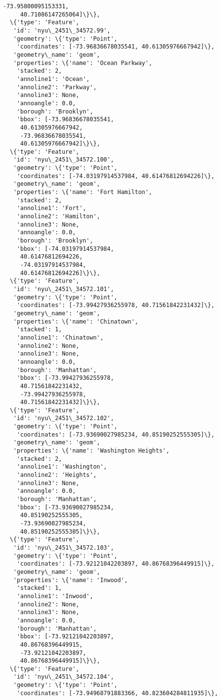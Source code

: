 \documentclass[11pt]{article}
\begin{document}
\begin{tcolorbox}[breakable, size=fbox, boxrule=.5pt, pad at break*=1mm, opacityfill=0]
\begin{Verbatim}[commandchars=\\\{\}]
     -73.95800095153331,
     40.71086147265064]\}\},
  \{'type': 'Feature',
   'id': 'nyu\_2451\_34572.99',
   'geometry': \{'type': 'Point',
    'coordinates': [-73.96836678035541, 40.61305976667942]\},
   'geometry\_name': 'geom',
   'properties': \{'name': 'Ocean Parkway',
    'stacked': 2,
    'annoline1': 'Ocean',
    'annoline2': 'Parkway',
    'annoline3': None,
    'annoangle': 0.0,
    'borough': 'Brooklyn',
    'bbox': [-73.96836678035541,
     40.61305976667942,
     -73.96836678035541,
     40.61305976667942]\}\},
  \{'type': 'Feature',
   'id': 'nyu\_2451\_34572.100',
   'geometry': \{'type': 'Point',
    'coordinates': [-74.03197914537984, 40.61476812694226]\},
   'geometry\_name': 'geom',
   'properties': \{'name': 'Fort Hamilton',
    'stacked': 2,
    'annoline1': 'Fort',
    'annoline2': 'Hamilton',
    'annoline3': None,
    'annoangle': 0.0,
    'borough': 'Brooklyn',
    'bbox': [-74.03197914537984,
     40.61476812694226,
     -74.03197914537984,
     40.61476812694226]\}\},
  \{'type': 'Feature',
   'id': 'nyu\_2451\_34572.101',
   'geometry': \{'type': 'Point',
    'coordinates': [-73.99427936255978, 40.71561842231432]\},
   'geometry\_name': 'geom',
   'properties': \{'name': 'Chinatown',
    'stacked': 1,
    'annoline1': 'Chinatown',
    'annoline2': None,
    'annoline3': None,
    'annoangle': 0.0,
    'borough': 'Manhattan',
    'bbox': [-73.99427936255978,
     40.71561842231432,
     -73.99427936255978,
     40.71561842231432]\}\},
  \{'type': 'Feature',
   'id': 'nyu\_2451\_34572.102',
   'geometry': \{'type': 'Point',
    'coordinates': [-73.93690027985234, 40.85190252555305]\},
   'geometry\_name': 'geom',
   'properties': \{'name': 'Washington Heights',
    'stacked': 2,
    'annoline1': 'Washington',
    'annoline2': 'Heights',
    'annoline3': None,
    'annoangle': 0.0,
    'borough': 'Manhattan',
    'bbox': [-73.93690027985234,
     40.85190252555305,
     -73.93690027985234,
     40.85190252555305]\}\},
  \{'type': 'Feature',
   'id': 'nyu\_2451\_34572.103',
   'geometry': \{'type': 'Point',
    'coordinates': [-73.92121042203897, 40.86768396449915]\},
   'geometry\_name': 'geom',
   'properties': \{'name': 'Inwood',
    'stacked': 1,
    'annoline1': 'Inwood',
    'annoline2': None,
    'annoline3': None,
    'annoangle': 0.0,
    'borough': 'Manhattan',
    'bbox': [-73.92121042203897,
     40.86768396449915,
     -73.92121042203897,
     40.86768396449915]\}\},
  \{'type': 'Feature',
   'id': 'nyu\_2451\_34572.104',
   'geometry': \{'type': 'Point',
    'coordinates': [-73.94968791883366, 40.823604284811935]\},

\end{Verbatim}
\end{tcolorbox}
\end{document}
